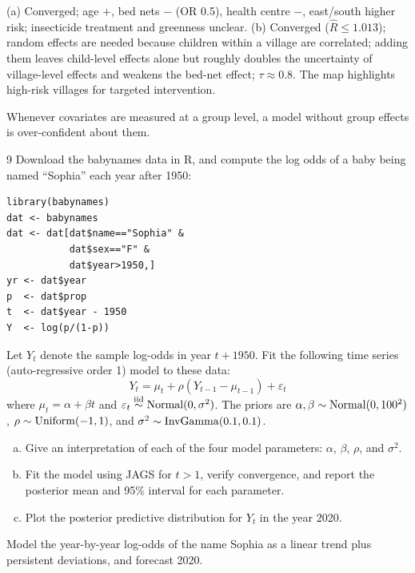 \documentclass[11pt]{article}
\begin{document}
\begin{answer}
(a) Converged; age $+$, bed nets $-$ (OR 0.5), health centre $-$, east/south higher risk; insecticide treatment and greenness unclear. (b) Converged ($\hat R\le1.013$); random effects are needed because children within a village are correlated; adding them leaves child-level effects alone but roughly doubles the uncertainty of village-level effects and weakens the bed-net effect; $\tau\approx0.8$. The map highlights high-risk villages for targeted intervention.
\end{answer}

\begin{takeaway}
Whenever covariates are measured at a group level, a model without group effects is over-confident about them.
\end{takeaway}


\begin{problem}{9}
Download the babynames data in R, and compute the log odds of a baby being named ``Sophia'' each year after 1950:
\begin{lstlisting}
library(babynames)
dat <- babynames
dat <- dat[dat$name=="Sophia" &
           dat$sex=="F" &
           dat$year>1950,]
yr <- dat$year
p  <- dat$prop
t  <- dat$year - 1950
Y  <- log(p/(1-p))
\end{lstlisting}
Let $Y_t$ denote the sample log-odds in year $t+1950$. Fit the following time series (auto-regressive order 1) model to these data:
\[
Y_t=\mu_t+\rho(Y_{t-1}-\mu_{t-1})+\varepsilon_t
\]
where $\mu_t=\alpha+\beta t$ and $\varepsilon_t\stackrel{\text{iid}}{\sim}\mathrm{Normal}(0,\sigma^2)$. The priors are $\alpha,\beta\sim\mathrm{Normal}(0,100^2)$, $\rho\sim\mathrm{Uniform}(-1,1)$, and $\sigma^2\sim\mathrm{InvGamma}(0.1,0.1)$.
\begin{enumerate}[(a)]
\item Give an interpretation of each of the four model parameters: $\alpha$, $\beta$, $\rho$, and $\sigma^2$.
\item Fit the model using JAGS for $t>1$, verify convergence, and report the posterior mean and 95\% interval for each parameter.
\item Plot the posterior predictive distribution for $Y_t$ in the year 2020.
\end{enumerate}
\end{problem}

\begin{restate}
Model the year-by-year log-odds of the name Sophia as a linear trend plus persistent deviations, and forecast 2020.
\end{restate}
\end{document}
